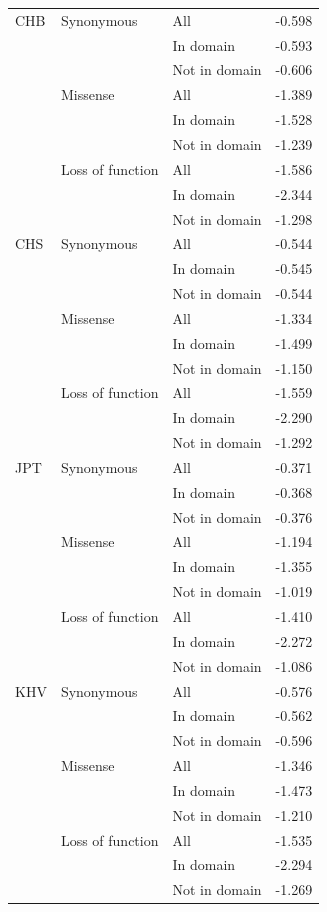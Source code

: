 \documentclass[]{article}
\begin{document}
\begin{longtable}[t]{lllr}
\addlinespace
CHB & Synonymous & All & -0.598\\
 &  & In domain & -0.593\\
 &  & Not in domain & -0.606\\
 & Missense & All & -1.389\\
 &  & In domain & -1.528\\
 &  & Not in domain & -1.239\\
 & Loss of function & All & -1.586\\
 &  & In domain & -2.344\\
 &  & Not in domain & -1.298\\
\addlinespace
CHS & Synonymous & All & -0.544\\
 &  & In domain & -0.545\\
 &  & Not in domain & -0.544\\
 & Missense & All & -1.334\\
 &  & In domain & -1.499\\
 &  & Not in domain & -1.150\\
 & Loss of function & All & -1.559\\
 &  & In domain & -2.290\\
 &  & Not in domain & -1.292\\
\addlinespace
JPT & Synonymous & All & -0.371\\
 &  & In domain & -0.368\\
 &  & Not in domain & -0.376\\
 & Missense & All & -1.194\\
 &  & In domain & -1.355\\
 &  & Not in domain & -1.019\\
 & Loss of function & All & -1.410\\
 &  & In domain & -2.272\\
 &  & Not in domain & -1.086\\
\addlinespace
KHV & Synonymous & All & -0.576\\
 &  & In domain & -0.562\\
 &  & Not in domain & -0.596\\
 & Missense & All & -1.346\\
 &  & In domain & -1.473\\
 &  & Not in domain & -1.210\\
 & Loss of function & All & -1.535\\
 &  & In domain & -2.294\\
 &  & Not in domain & -1.269\\*    
\end{longtable}
\end{document}
